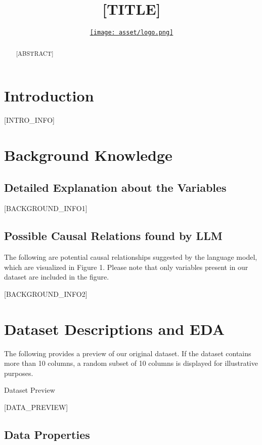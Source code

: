 \documentclass{article}
\title{[TITLE]}
\author{ \href{https://orcid.org/0000-0000-0000-0000}{\texttt{[image: asset/logo.png]}} }
\begin{document}
\maketitle

\begin{abstract}
[ABSTRACT]
\end{abstract}


\raggedbottom
\section{Introduction}
[INTRO_INFO]

\section{Background Knowledge}
\subsection{Detailed Explanation about the Variables}
[BACKGROUND_INFO1]

\subsection{Possible Causal Relations found by LLM}

The following are potential causal relationships suggested by the language model, which are visualized in Figure 1. Please note that only variables present in our dataset are included in the figure.

[BACKGROUND_INFO2]

\section{Dataset Descriptions and EDA}
The following provides a preview of our original dataset. If the dataset contains more than 10 columns, a random subset of 10 columns is displayed for illustrative purposes.

\begin{table}[H]
    \centering
    \caption{Dataset Preview}
    [DATA_PREVIEW]
\end{table}

\subsection{Data Properties}
\end{document}
